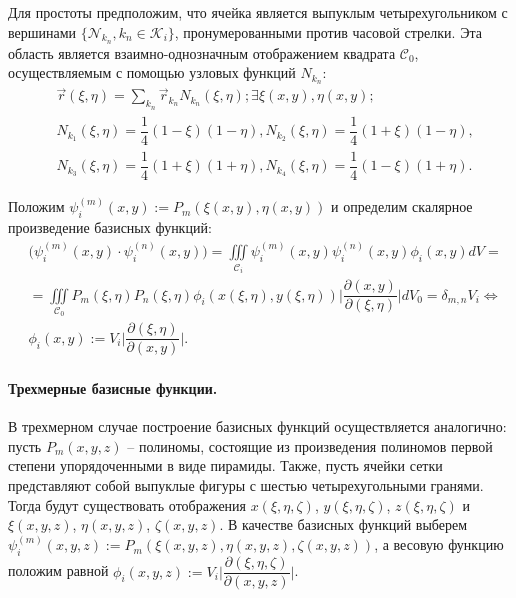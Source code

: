 \documentclass[14pt, a4paper, fleqn]{extreport}
\begin{document}
	Для простоты предположим, что ячейка является выпуклым четырехугольником
	с вершинами $\Big\lbrace \mathcal{N}_{k_n}, k_n \in \mathcal{K}_i \Big\rbrace$, 
	пронумерованными против часовой стрелки.
	Эта область является взаимно-однозначным отображением квадрата $\mathcal{C}_0$, 
	осуществляемым с помощью узловых функций $N_{k_n}$:
	\begin{equation*}
	\begin{split}
		&\vec{r}(\xi,\eta) = \sum\limits_{k_n} \vec{r}_{k_n} N_{k_n}(\xi, \eta); \exists \xi(x,y), \eta(x,y);
		\\
		&N_{k_1}(\xi,\eta) = \dfrac{1}{4}(1 - \xi)(1 - \eta), N_{k_2}(\xi, \eta) = \dfrac{1}{4}(1 + \xi)(1 - \eta), \\
		&N_{k_3}(\xi,\eta) = \dfrac{1}{4}(1 + \xi)(1 + \eta), N_{k_4}(\xi, \eta) = \dfrac{1}{4}(1 - \xi)(1 + \eta).
	\end{split}
	\end{equation*}
	
	Положим $\psi_i^{(m)}(x,y) := P_m(\xi(x,y),\eta(x,y))$ и
	определим скалярное произведение базисных функций:
	\begin{equation*}
	\begin{split}
		&\Big( \psi_i^{(m)}(x,y) \cdot \psi_i^{(n)}(x,y) \Big)
			= \iiint\limits_{\mathcal{C}_i} \psi_i^{(m)}(x,y) \psi_i^{(n)}(x,y) \phi_i(x,y) dV = \\
		&   = \iiint\limits_{\mathcal{C}_0} P_m(\xi,\eta) P_n(\xi,\eta) \phi_i(x(\xi,\eta),y(\xi,\eta)) 
				\Big|\dfrac{\partial(x,y)}{\partial(\xi,\eta)}\Big| dV_0
		    = \delta_{m,n} V_i \Leftrightarrow \\
		&\phi_i(x,y) := V_i\Big|\dfrac{\partial(\xi,\eta)}{\partial(x,y)}\Big|.
	\end{split}
	\end{equation*}
	
	\paragraph{Трехмерные базисные функции.}
	В трехмерном случае построение базисных функций осуществляется аналогично:
	пусть $P_m(x,y,z)$ -- полиномы, состоящие из произведения полиномов
	первой степени упорядоченными в виде пирамиды.
	Также, пусть ячейки сетки представляют собой выпуклые фигуры с шестью
	четырехугольными гранями.
	Тогда будут существовать отображения 
	$x(\xi,\eta,\zeta)$, $y(\xi,\eta,\zeta)$, $z(\xi,\eta,\zeta)$ и
	$\xi(x,y,z)$, $\eta(x,y,z)$, $\zeta(x,y,z)$.
	В качестве базисных функций выберем 
	$\psi_i^{(m)}(x,y,z) := P_m(\xi(x,y,z),\eta(x,y,z),\zeta(x,y,z))$, 
	а весовую функцию положим равной 
	$\phi_i(x,y,z) := V_i\Big|\dfrac{\partial(\xi,\eta,\zeta)}{\partial(x,y,z)}\Big|$.
	
\end{document}
